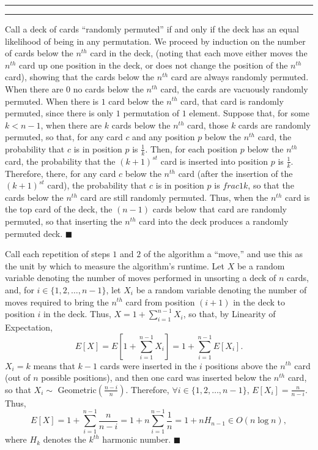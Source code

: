 \documentclass[11pt]{article}
\newcounter{questionCounter}
\newcounter{partCounter}[questionCounter]
\newenvironment{question}[2][\arabic{questionCounter}]{%
    \setcounter{partCounter}{0}%
    \vspace{.25in} \hrule \vspace{0.5em}%
        \noindent{\bf #2}%
    \vspace{0.8em} \hrule \vspace{.10in}%
    \addtocounter{questionCounter}{1}%
}{}
\begin{document}
\begin{question}{Problem 5: Unsorting algorithm}
Call a deck of cards ``randomly permuted'' if and only if the deck has an
equal likelihood of being in any permutation. We proceed by induction on the
number of cards below the $n^{th}$ card in the deck, (noting that each
move either moves the $n^{th}$ card up one position in the deck, or does not
change the position of the $n^{th}$ card), showing that the cards below the
$n^{th}$ card are always randomly permuted. When there are $0$ no cards below
the $n^{th}$ card, the cards are vacuously randomly permuted. When there is
$1$ card below the $n^{th}$ card, that card is randomly permuted, since there
is only $1$ permutation of $1$ element. Suppose that, for some $k < n - 1$,
when there are $k$ cards below the $n^{th}$ card, those $k$ cards are randomly
permuted, so that, for any card $c$ and any position $p$ below the $n^{th}$
card, the probability that $c$ is in position $p$ is $\frac{1}{k}$. Then,
for each position $p$ below the $n^{th}$ card, the probability that the
$(k + 1)^{st}$ card is inserted into position $p$ is $\frac{1}{k}$. Therefore,
there, for any card $c$ below the $n^{th}$ card (after the insertion of the
$(k + 1)^{st}$ card), the probability that $c$ is in position $p$ is
$frac{1}{k}$, so that the cards below the $n^{th}$ card are still randomly
permuted. Thus, when the $n^{th}$ card is the top card of the deck, the
$(n - 1)$ cards below that card are randomly permuted, so that inserting the
$n^{th}$ card into the deck produces a randomly permuted deck. \qquad
$\blacksquare$

Call each repetition of steps $1$ and $2$ of the algorithm a ``move,'' and use
this as the unit by which to measure the algorithm's runtime. Let $X$ be a
random variable denoting the number of moves performed in unsorting a deck of
$n$ cards, and, for $i \in \{1,2,\ldots,n - 1\}$, let $X_i$ be a random
variable denoting the number of moves required to bring the $n^{th}$ card from
position $(i + 1)$ in the deck to position $i$ in the deck. Thus,
$X = 1 + \sum_{i = 1}^{n - 1} X_i$, so that, by Linearity of Expectation,
\[E[X] = E\left[1 + \sum_{i = 1}^{n -1} X_i\right]
                          = 1 + \sum_{i = 1}^{n -1} E[X_i].\]
$X_i = k$ means that $k - 1$ cards were inserted in the $i$
positions above the $n^{th}$ card (out of $n$ possible positions), and then
one card was inserted below the $n^{th}$ card, so that
$X_i \sim$ Geometric$\left(\frac{n - i}{n}\right)$.
Therefore, $\forall i \in \{1,2,\ldots,n - 1\}$, $E[X_i] = \frac{n}{n - i}$.
Thus,\[E[X] = 1 + \sum_{i = 1}^{n - 1} \frac{n}{n - i}
         = 1 + n\sum_{i = 1}^{n - 1} \frac{1}{n} = 1 + nH_{n - 1} \in O(n \log n),\]
where $H_k$ denotes the $k^{th}$ harmonic number. \qquad $\blacksquare$
\end{question}
\end{document}
